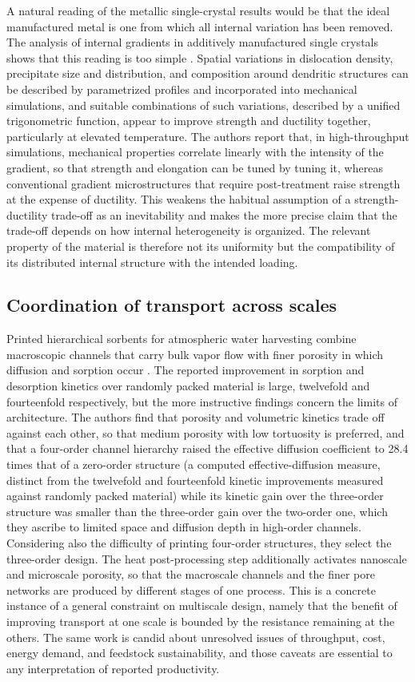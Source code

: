 \documentclass[11pt]{article}
\theoremstyle{definition}
\begin{document}
A natural reading of the metallic single-crystal results would be that the ideal manufactured metal is one from which all internal variation has been removed. The analysis of internal gradients in additively manufactured single crystals shows that this reading is too simple \cite{guo2025}. Spatial variations in dislocation density, precipitate size and distribution, and composition around dendritic structures can be described by parametrized profiles and incorporated into mechanical simulations, and suitable combinations of such variations, described by a unified trigonometric function, appear to improve strength and ductility together, particularly at elevated temperature. The authors report that, in high-throughput simulations, mechanical properties correlate linearly with the intensity of the gradient, so that strength and elongation can be tuned by tuning it, whereas conventional gradient microstructures that require post-treatment raise strength at the expense of ductility. This weakens the habitual assumption of a strength-ductility trade-off as an inevitability and makes the more precise claim that the trade-off depends on how internal heterogeneity is organized. The relevant property of the material is therefore not its uniformity but the compatibility of its distributed internal structure with the intended loading.

\subsection{Coordination of transport across scales}

Printed hierarchical sorbents for atmospheric water harvesting combine macroscopic channels that carry bulk vapor flow with finer porosity in which diffusion and sorption occur \cite{bai2026}. The reported improvement in sorption and desorption kinetics over randomly packed material is large, twelvefold and fourteenfold respectively, but the more instructive findings concern the limits of architecture. The authors find that porosity and volumetric kinetics trade off against each other, so that medium porosity with low tortuosity is preferred, and that a four-order channel hierarchy raised the effective diffusion coefficient to 28.4 times that of a zero-order structure (a computed effective-diffusion measure, distinct from the twelvefold and fourteenfold kinetic improvements measured against randomly packed material) while its kinetic gain over the three-order structure was smaller than the three-order gain over the two-order one, which they ascribe to limited space and diffusion depth in high-order channels. Considering also the difficulty of printing four-order structures, they select the three-order design. The heat post-processing step additionally activates nanoscale and microscale porosity, so that the macroscale channels and the finer pore networks are produced by different stages of one process. This is a concrete instance of a general constraint on multiscale design, namely that the benefit of improving transport at one scale is bounded by the resistance remaining at the others. The same work is candid about unresolved issues of throughput, cost, energy demand, and feedstock sustainability, and those caveats are essential to any interpretation of reported productivity.
\end{document}
